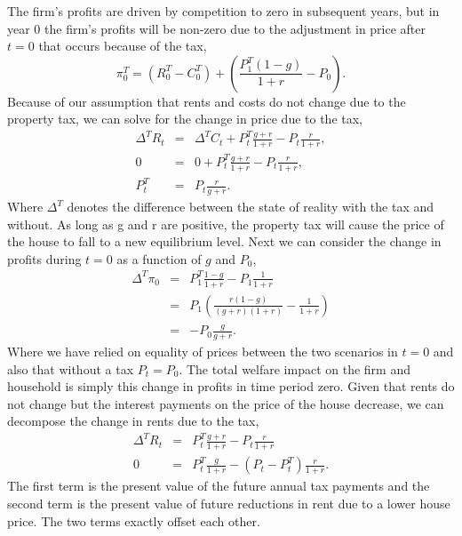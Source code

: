 \documentclass[ecta,nameyear,draft]{econsocart}
\theoremstyle{plain}
\theoremstyle{remark}
\begin{document}
The firm's profits are driven by competition to zero in subsequent years, but in year 0 the firm's profits will be non-zero due to the adjustment in price after $t=0$ that occurs because of the tax,
\begin{equation*}
	\pi^T_0 = (R^T_0-C^T_0)+\left(\frac{P^T_{1}(1-g)}{1+r}-P_0\right).\label{piT0}
\end{equation*}
Because of our assumption that rents and costs do not change due to the property tax, we can solve for the change in price due to the tax,
\begin{eqnarray}
	\Delta^T R_t&=&\Delta^T C_t+P^T_{t}\frac{g+r}{1+r}-P_{t} \frac{r}{1+r},\nonumber \\
	0&=&0+P^T_{t}\frac{g+r}{1+r}-P_{t} \frac{r}{1+r},\nonumber \\
	P^T_t&=& P_t\frac{r}{g+r}.\label{TxPrice} \label{Ptax}
\end{eqnarray}
Where $\Delta^T$ denotes the difference between the state of reality with the tax and without. As long as g and r are positive, the property tax will cause the price of the house to fall to a new equilibrium level.
Next we can consider the change in profits during $t=0$ as a function of $g$ and $P_0$,
\begin{eqnarray*}
	\Delta^T \pi_0 &=& P_1^T\frac{1-g}{1+r}-P_1\frac{1}{1+r}\\
	&=& P_1\left(\frac{r(1-g)}{(g+r)(1+r)}-\frac{1}{1+r}\right)\\
	&=&-P_0\frac{g}{g+r}.
\end{eqnarray*}
Where we have relied on equality of prices between the two scenarios in $t=0$ and also that without a tax $P_t=P_0$. The total welfare impact on the firm and household is simply this change in profits in time period zero.
Given that rents do not change but the interest payments on the price of the house decrease, we can decompose the change in rents due to the tax,
\begin{eqnarray*}
	\Delta^T R_t&=&P^T_t\frac{g+r}{1+r}-P_t\frac{r}{1+r}\\
	0&=&P^T_t\frac{g}{1+r}-(P_t-P_t^T)\frac{r}{1+r}.
\end{eqnarray*}
The first term is the present value of the future annual tax payments and the second term is the present value of future reductions in rent due to a lower house price. The two terms exactly offset each other.
\end{document}
